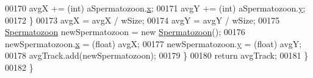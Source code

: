 \begin{DoxyCode}
00170         avgX += (int) aSpermatozoon.\hyperlink{classdata_1_1_spermatozoon_ad0da36b2558901e21e7a30f6c227a45e}{x};
00171         avgY += (\textcolor{keywordtype}{int}) aSpermatozoon.\hyperlink{classdata_1_1_spermatozoon_aa4f0d3eebc3c443f9be81bf48561a217}{y};
00172       \}
00173       avgX = avgX / wSize;
00174       avgY = avgY / wSize;
00175       \hyperlink{classdata_1_1_spermatozoon}{Spermatozoon} newSpermatozoon = \textcolor{keyword}{new} \hyperlink{classdata_1_1_spermatozoon}{Spermatozoon}();
00176       newSpermatozoon.\hyperlink{classdata_1_1_spermatozoon_ad0da36b2558901e21e7a30f6c227a45e}{x} = (float) avgX;
00177       newSpermatozoon.\hyperlink{classdata_1_1_spermatozoon_aa4f0d3eebc3c443f9be81bf48561a217}{y} = (float) avgY;
00178       avgTrack.add(newSpermatozoon);
00179     \}
00180     \textcolor{keywordflow}{return} avgTrack;
00181   \}
00182 \}
\end{DoxyCode}
